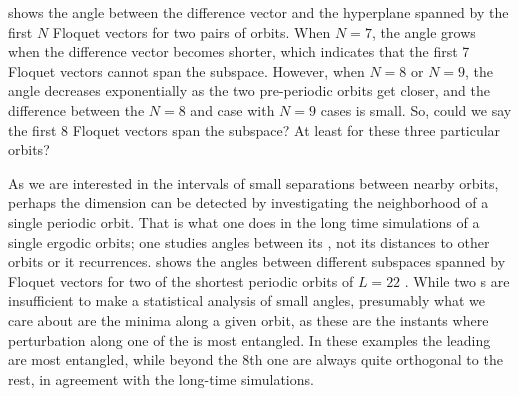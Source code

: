  shows the angle between the difference vector and
the hyperplane spanned by the first $N$ Floquet vectors for two pairs
of orbits.
When $N=7$, the angle grows when the difference vector becomes shorter,
which indicates that the first 7 Floquet vectors cannot span the
{\entangled} subspace. However, when $N=8$ or $N=9$, the angle decreases
exponentially
 as the two pre-periodic orbits get closer, and the
difference between the $N=8$ and case with $N=9$ cases is small. So,
could we say the first 8 Floquet vectors span the {\entangled} subspace?
At least for these three particular orbits?

As we are interested in the intervals of small separations between nearby
orbits, perhaps the {\entangled} dimension can be detected by
investigating the neighborhood of a single periodic orbit. That is what
one does in the long time simulations of a single ergodic orbits; one
studies angles between its {\cLvs}, not its distances to other orbits or
it recurrences.  shows the angles between
different subspaces spanned by Floquet vectors for two of the shortest
periodic orbits of $L=22$ \KS.
While two \po s are insufficient to make a statistical analysis of small
angles, presumably what we care about are the minima along a given orbit,
as these are the instants where perturbation along one of the {\cLvs} is
most entangled. In these examples the leading {\cLvs} are most entangled,
while {\cLvs} beyond the 8th one are always quite orthogonal to the rest,
in agreement with the long-time simulations.

